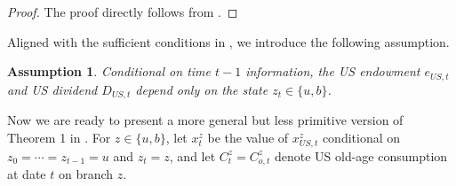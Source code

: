 \documentclass[12pt]{article}
\theoremstyle{plain}
\newtheorem{ass}{Assumption}
\begin{document}
\begin{proof}
The proof directly follows from \citet{hirano2025technological}.
\end{proof}

Aligned with the sufficient conditions in , we introduce the following assumption.

\begin{ass}\label{ass_switch_dependence}
Conditional on time $t-1$ information, the US endowment $e_{US,t}$ and US dividend $D_{US,t}$ depend only on the state
$z_t \in \{u,b\}$.
\end{ass}


Now we are ready to present a more general but less primitive version of Theorem 1 in \citet{hirano2025technological}.
For $z\in\{u,b\}$, let $x_t^z$ be the value of $x_{US,t}^z$ conditional on $z_0=\cdots=z_{t-1}=u$ and $z_t=z$,
and let $C_t^z=C_{o,t}^z$ denote US old-age consumption at date $t$ on branch $z$.
\end{document}
